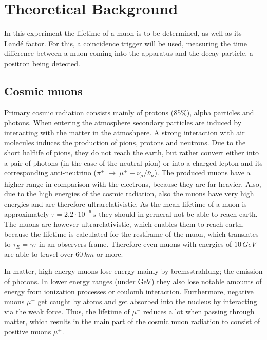 \documentclass{include/thesisclass3}
\newcommand{\cc}{\cdot}
\newcommand{\df}{\rightarrow}
\newcommand{\e}[1]{\,\si{#1}}
\begin{document}
	\FrontMatter
	
	\tableofcontents                  
	\newpage
	\MainMatter


\chapter{Theoretical Background}

In this experiment the lifetime of a muon is to be determined, as well as its Landé factor.
For this, a coincidence trigger will be used, measuring the time difference between a muon coming into the apparatus and the decay particle, a positron being detected.

\section{Cosmic muons}
Primary cosmic radiation consists mainly of protons (85\%), alpha particles and photons.
When entering the atmosphere secondary particles are induced by interacting with the matter in the atmoshpere.
A strong interaction with air molecules induces the production of pions, protons and neutrons.
Due to the short halflife of pions, they do not reach the earth, but rather convert either into a pair of photons (in the case of the neutral pion) or into a charged lepton and its corresponding anti-neutrino ($\pi^\pm ~\df~ \mu^\pm + \nu_\mu/\bar{\nu}_\mu$).
The produced muons have a higher range in comparison with the electrons, because they are far heavier.
Also, due to the high energies of the cosmic radiation, also the muons have very high energies and are therefore ultrarelativistic.
As the mean lifetime of a muon is approximately $\tau = 2.2\cc10^{-6}\e{s}$ they should in gerneral not be able to reach earth.
The muons are however ultrarelativistic, which enables them to reach earth, because the lifetime is calculated for the restframe of the muon, which translates to $\tau_E = \gamma \tau$ in an observers frame.
Therefore even muons with energies of $10\e{GeV}$ are able to travel over $60\e{km}$ or more.

In matter, high energy muons lose energy mainly by bremsstrahlung; the emission of photons.
In lower energy ranges (under GeV) they also lose notable amounts of energy from ionization processes or coulomb interaction.
Furthermore, negative muons $\mu^-$ get caught by atoms and get absorbed into the nucleus by interacting via the weak force.
Thus, the lifetime of $\mu^-$ reduces a lot when passing through matter, which results in the main part of the cosmic muon radiation to consist of positive muons $\mu^+$.
\end{document}
